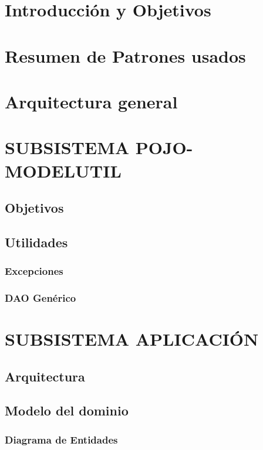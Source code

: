 \documentclass[12pt, a4paper, twoside]{book}
\begin{document}
	\section{Introducción y Objetivos}
	\section{Resumen de Patrones usados\cite{Patrones}}
	
	\section{Arquitectura general}
	\section{SUBSISTEMA POJO-MODELUTIL}
	\subsection{Objetivos}  	
	\subsection{Utilidades}
	\subsubsection{Excepciones}
	
	\subsubsection{DAO Genérico}
	
	\section{SUBSISTEMA APLICACIÓN}

	\subsection{Arquitectura}
	
	\subsection{Modelo del dominio}    
	
	\subsubsection{Diagrama de Entidades}
	
\end{document}
